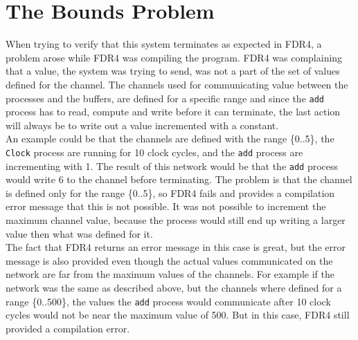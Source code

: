 \section{The Bounds Problem}
When trying to verify that this system terminates as expected in FDR4, a problem arose while FDR4 was compiling the program. FDR4 was complaining that a value, the system was trying to send, was not a part of the set of values defined for the channel.
The channels used for communicating value between the processes and the buffers, are defined for a specific range and since the \texttt{add} process has to read, compute and write before it can terminate, the last action will always be to write out a value incremented with a constant.\\

An example could be that the channels are defined with the range \{0..5\}, the \texttt{Clock} process are running for 10 clock cycles, and the \texttt{add} process are incrementing with 1.
The result of this network would be that the \texttt{add} process would write 6 to the channel before terminating. The problem is that the channel is defined only for the range \{0..5\}, so FDR4 fails and provides a compilation error message that this is not possible. It was not possible to increment the maximum channel value, because the process would still end up writing a larger value then what was defined for it.\\

The fact that FDR4 returns an error message in this case is great, but the error message is also provided even though the actual values communicated on the network are far from the maximum values of the channels. For example if the network was the same as described above, but the channels where defined for a range \{0..500\}, the values the \texttt{add} process would communicate after 10 clock cycles would not be near the maximum value of 500. But in this case, FDR4 still provided a compilation error. \\


